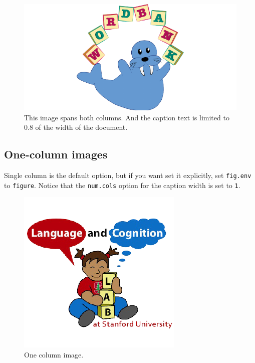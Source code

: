 \documentclass[10pt, letterpaper]{article}
\newenvironment{CodeChunk}{}{}
\begin{document}
\begin{CodeChunk}
\begin{figure}[h]

{\centering \includegraphics{figs/2-col-image-1}

}

\caption[This image spans both columns]{This image spans both columns. And the caption text is limited to 0.8 of the width of the document.}\label{fig:2-col-image}
\end{figure}
\end{CodeChunk}

\subsection{One-column images}\label{one-column-images}

Single column is the default option, but if you want set it explicitly,
set \texttt{fig.env} to \texttt{figure}. Notice that the
\texttt{num.cols} option for the caption width is set to \texttt{1}.

\begin{CodeChunk}
\begin{figure}[H]

{\centering \includegraphics{figs/image-1}

}

\caption[One column image]{One column image.}\label{fig:image}
\end{figure}
\end{CodeChunk}
\end{document}

